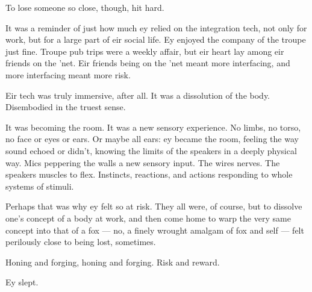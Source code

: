To lose someone so close, though, hit hard.

It was a reminder of just how much ey relied on the integration tech, not only for work, but for a large part of eir social life. Ey enjoyed the company of the troupe just fine. Troupe pub trips were a weekly affair, but eir heart lay among eir friends on the 'net. Eir friends being on the 'net meant more interfacing, and more interfacing meant more risk.

Eir tech was truly immersive, after all. It was a dissolution of the body. Disembodied in the truest sense.

It was becoming the room. It was a new sensory experience. No limbs, no torso, no face or eyes or ears. Or maybe all ears: ey became the room, feeling the way sound echoed or didn't, knowing the limits of the speakers in a deeply physical way. Mics peppering the walls a new sensory input. The wires nerves. The speakers muscles to flex. Instincts, reactions, and actions responding to whole systems of stimuli.

Perhaps that was why ey felt so at risk. They all were, of course, but to dissolve one's concept of a body at work, and then come home to warp the very same concept into that of a fox --- no, a finely wrought amalgam of fox and self --- felt perilously close to being lost, sometimes.

Honing and forging, honing and forging. Risk and reward.

Ey slept.
